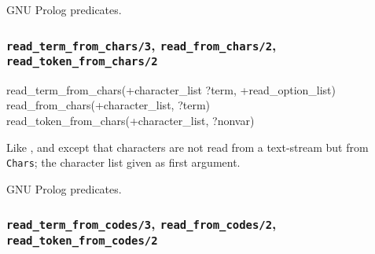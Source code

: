 \Portability

GNU Prolog predicates.

\subsubsection{\texttt{read\_term\_from\_chars/3},
               \texttt{read\_from\_chars/2},
               \texttt{read\_token\_from\_chars/2}}

\begin{TemplatesOneCol}
read\_term\_from\_chars(+character\_list ?term,
+read\_option\_list)\\
read\_from\_chars(+character\_list, ?term)\\
read\_token\_from\_chars(+character\_list, ?nonvar)

\end{TemplatesOneCol}

\Description

\texttt{}%
\texttt{}%
\texttt{}%
Like ,   and
  except that characters are not
read from a text-stream but from \texttt{Chars}; the character list given as
first argument.

\begin{PlErrors}





\end{PlErrors}

\Portability

GNU Prolog predicates.

\subsubsection{\texttt{read\_term\_from\_codes/3},
               \texttt{read\_from\_codes/2},
               \texttt{read\_token\_from\_codes/2}}

